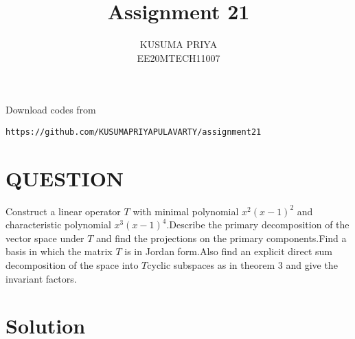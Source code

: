 \documentclass[journal,12pt,onecolumn]{IEEEtran}
\begin{document}
\renewcommand{\thefigure}{\theproblem}

\def\putbox#1#2#3{\makebox[0in][l]{\makebox[#1][l]{}\raisebox{\baselineskip}[0in][0in]{\raisebox{#2}[0in][0in]{#3}}}}
     \def\rightbox#1{\makebox[0in][r]{#1}}
     \def\centbox#1{\makebox[0in]{#1}}
     \def\topbox#1{\raisebox{-\baselineskip}[0in][0in]{#1}}
     \def\midbox#1{\raisebox{-0.5\baselineskip}[0in][0in]{#1}}
\vspace{3cm}
\title{Assignment 21}
\author{KUSUMA PRIYA\\EE20MTECH11007}

\maketitle

\bigskip
\renewcommand{\thefigure}{\theenumi}
\renewcommand{\thetable}{\theenumi}
Download codes from 
%
\begin{lstlisting}
https://github.com/KUSUMAPRIYAPULAVARTY/assignment21
\end{lstlisting}
%

\section{QUESTION}
Construct a linear operator $T$ with minimal polynomial $x^2(x-1)^2$ and characteristic polynomial $x^3(x-1)^4$.Describe the primary decomposition of the vector space under $T$ and find the projections on the primary components.Find a basis in which the matrix $T$ is in Jordan form.Also find an explicit direct sum decomposition of the space into $T$cyclic subspaces as in theorem 3 and give the invariant factors.

%

\section{Solution}
\end{document}
